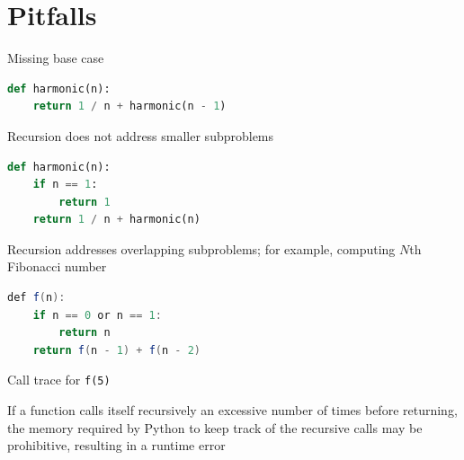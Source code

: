 \documentclass[8pt,a4paper,compress]{beamer}
\begin{document}
\section{Pitfalls}
\begin{frame}[fragile]
\pause

Missing base case
\begin{lstlisting}[language=Python]
def harmonic(n):
    return 1 / n + harmonic(n - 1)
\end{lstlisting}

\pause
\bigskip

Recursion does not address smaller subproblems
\begin{lstlisting}[language=Python]
def harmonic(n):
    if n == 1:
        return 1
    return 1 / n + harmonic(n)
\end{lstlisting}

\pause
\bigskip

\begin{minipage}{150pt}
Recursion addresses overlapping subproblems; for example, computing $N$th Fibonacci number

\begin{lstlisting}[language=Java]
def f(n):
    if n == 0 or n == 1:
        return n
    return f(n - 1) + f(n - 2)  
\end{lstlisting}
\end{minipage}
\begin{minipage}{150pt}
\begin{center}
Call trace for \lstinline{f(5)}

\smallskip

\end{center}
\end{minipage}

\pause
\bigskip

If a function calls itself recursively an excessive number of times before returning, the memory required by Python to keep track of the recursive calls may be prohibitive, resulting in a runtime error
\end{frame}
\end{document}
